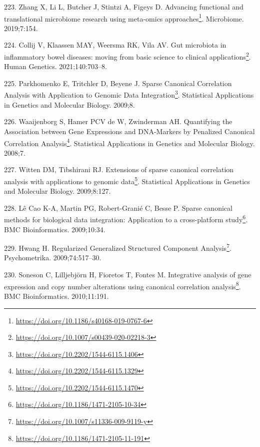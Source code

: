 \documentclass[
  a4paper,
]{book}
\DeclareRobustCommand{\href}[2]{#2\footnote{\url{#1}}}
\newlength{\cslhangindent}
\newlength{\cslentryspacingunit} %
\newenvironment{CSLReferences}[2] %
 {%
  \setlength{\parindent}{0pt}
  \ifodd #1
  \let\oldpar\par
  \def\par{\hangindent=\cslhangindent\oldpar}
  \fi
  \setlength{\parskip}{#2\cslentryspacingunit}
 }%
 {}
\begin{document}
\begin{CSLReferences}{0}{0}
\leavevmode{}%
223. Zhang X, Li L, Butcher J, Stintzi A, Figeys D. \href{https://doi.org/10.1186/s40168-019-0767-6}{Advancing functional and translational microbiome research using meta-omics approaches}. Microbiome. 2019;7:154.

\leavevmode{}%
224. Collij V, Klaassen MAY, Weersma RK, Vila AV. \href{https://doi.org/10.1007/s00439-020-02218-3}{Gut microbiota in inflammatory bowel diseases: moving from basic science to clinical applications}. Human Genetics. 2021;140:703--8.

\leavevmode{}%
225. Parkhomenko E, Tritchler D, Beyene J. \href{https://doi.org/10.2202/1544-6115.1406}{Sparse Canonical Correlation Analysis with Application to Genomic Data Integration}. Statistical Applications in Genetics and Molecular Biology. 2009;8.

\leavevmode{}%
226. Waaijenborg S, Hamer PCV de W, Zwinderman AH. \href{https://doi.org/10.2202/1544-6115.1329}{Quantifying the Association between Gene Expressions and DNA-Markers by Penalized Canonical Correlation Analysis}. Statistical Applications in Genetics and Molecular Biology. 2008;7.

\leavevmode{}%
227. Witten DM, Tibshirani RJ. \href{https://doi.org/10.2202/1544-6115.1470}{Extensions of sparse canonical correlation analysis with applications to genomic data}. Statistical Applications in Genetics and Molecular Biology. 2009;8:127.

\leavevmode{}%
228. Lê Cao K-A, Martin PG, Robert-Granié C, Besse P. \href{https://doi.org/10.1186/1471-2105-10-34}{Sparse canonical methods for biological data integration: Application to a cross-platform study}. BMC Bioinformatics. 2009;10:34.

\leavevmode{}%
229. Hwang H. \href{https://doi.org/10.1007/s11336-009-9119-y}{Regularized Generalized Structured Component Analysis}. Psychometrika. 2009;74:517--30.

\leavevmode{}%
230. Soneson C, Lilljebjörn H, Fioretos T, Fontes M. \href{https://doi.org/10.1186/1471-2105-11-191}{Integrative analysis of gene expression and copy number alterations using canonical correlation analysis}. BMC Bioinformatics. 2010;11:191.


\end{CSLReferences}
\end{document}
